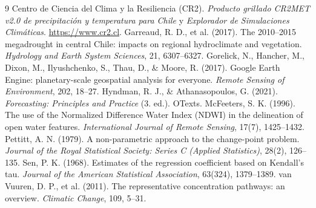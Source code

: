 \documentclass[11pt,a4paper]{article}
\begin{document}
\begin{thebibliography}{9}
 Centro de Ciencia del Clima y la Resiliencia (CR2). \emph{Producto grillado CR2MET v2.0 de precipitación y temperatura para Chile} y \emph{Explorador de Simulaciones Climáticas}. \url{https://www.cr2.cl}. %
 Garreaud, R. D., et al. (2017). The 2010--2015 megadrought in central Chile: impacts on regional hydroclimate and vegetation. \emph{Hydrology and Earth System Sciences}, 21, 6307--6327.
 Gorelick, N., Hancher, M., Dixon, M., Ilyushchenko, S., Thau, D., \& Moore, R. (2017). Google Earth Engine: planetary-scale geospatial analysis for everyone. \emph{Remote Sensing of Environment}, 202, 18--27.
 Hyndman, R. J., \& Athanasopoulos, G. (2021). \emph{Forecasting: Principles and Practice} (3.\textordfeminine{} ed.). OTexts.
 McFeeters, S. K. (1996). The use of the Normalized Difference Water Index (NDWI) in the delineation of open water features. \emph{International Journal of Remote Sensing}, 17(7), 1425--1432.
 Pettitt, A. N. (1979). A non-parametric approach to the change-point problem. \emph{Journal of the Royal Statistical Society: Series C (Applied Statistics)}, 28(2), 126--135.
 Sen, P. K. (1968). Estimates of the regression coefficient based on Kendall's tau. \emph{Journal of the American Statistical Association}, 63(324), 1379--1389.
 van Vuuren, D. P., et al. (2011). The representative concentration pathways: an overview. \emph{Climatic Change}, 109, 5--31.
\end{thebibliography}
\end{document}
